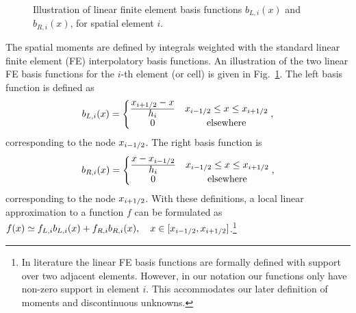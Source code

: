 \begin{figure}[H]
    \centering
    \begin{centering}
    \end{centering}
    \caption{Illustration of linear finite element basis functions $b_{L,i}(x)$ and
    $b_{R,i}(x)$, for spatial element $i$.\label{fig:lin_fe}}
\end{figure}

The spatial moments are defined by integrals weighted with the standard linear finite element (FE)
interpolatory basis functions.  An illustration of the two linear FE basis functions for
the $i$-th element (or cell) is
given in Fig.~\ref{fig:lin_fe}.  The left basis function is defined as
\begin{equation}
    b_{L,i}(x)= \left\{\begin{matrix} \frac{\displaystyle x_{{i+1/2}} - x}{\displaystyle h_i} & x_{{i-1/2}} \leq x \leq x_{{i+1/2}}
        \\ 0 &  \text{elsewhere}
    \end{matrix}\right.,
\end{equation}
corresponding to the node $x_{{i-1/2}}$.
The right basis function is 
\begin{equation}
    b_{R,i}(x)= \left\{\begin{matrix} \frac{\displaystyle x - x_{{i-1/2}}}{\displaystyle h_i} & x_{{i-1/2}} \leq x \leq x_{{i+1/2}}
        \\ 0 & \text{elsewhere}
    \end{matrix}\right. ,
\end{equation}
corresponding to the node $x_{{i+1/2}}$. With these definitions, a local linear approximation to a
function $f$ can be formulated as $f(x)\simeq f_{L,i} b_{L,i}(x) + f_{R,i}
b_{R,i}(x),\quad x\in[x_{{i-1/2}},x_{{i+1/2}}]$.\footnote{In literature the linear FE basis functions are
formally defined with support over two adjacent elements.  However, in our notation our 
functions only have non-zero support in element $i$. This accommodates our later
definition of moments and discontinuous unknowns.}

